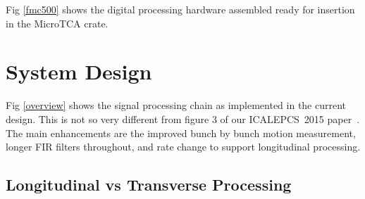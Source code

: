 \documentclass[
    a4paper,
    keeplastbox,            %
    hyphens,                %
    boxit,                  %
]{jacow}
\begin{document}
Fig \ref{fmc500} shows the digital processing hardware assembled ready for
insertion in the MicroTCA crate.


\section{System Design}

Fig \ref{overview} shows the signal processing chain as implemented in the
current design.  This is not so very different from figure 3 of our
ICALEPCS~2015 paper~\cite{icalepcs2015}.  The main enhancements are the improved
bunch by bunch motion measurement, longer FIR filters throughout, and rate
change to support longitudinal processing.

\subsection{Longitudinal vs Transverse Processing}
\end{document}
